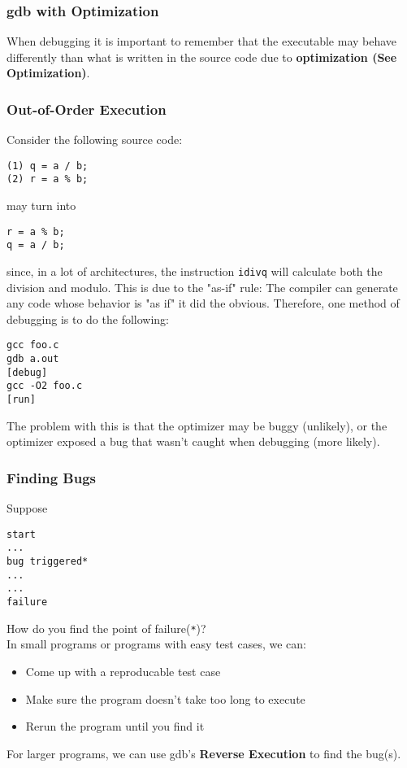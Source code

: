 \documentclass[13pt]{article}
\begin{document}
\subsubsection{gdb with Optimization}
When debugging it is important to remember that the executable may behave differently than what is written in the source code due to \textbf{optimization (See Optimization)}.

\subsubsection*{Out-of-Order Execution}
Consider the following source code:
\begin{verbatim}
(1) q = a / b;
(2) r = a % b;
\end{verbatim}
may turn into
\begin{verbatim}
r = a % b;
q = a / b;
\end{verbatim}
since, in a lot of architectures, the instruction \texttt{idivq} will calculate both the division and modulo. This is due to the "as-if" rule: The compiler can generate any code whose behavior is "as if" it did the obvious. Therefore, one method of debugging is to do the following:
\begin{verbatim}
gcc foo.c
gdb a.out
[debug]
gcc -O2 foo.c
[run]
\end{verbatim}
The problem with this is that the optimizer may be buggy (unlikely), or the optimizer exposed a bug that wasn't caught when debugging (more likely).

\subsubsection{Finding Bugs}
Suppose
\begin{verbatim}
start
...
bug triggered*
...
...
failure
\end{verbatim}
How do you find the point of failure(\texttt{*})? \\
In small programs or programs with easy test cases, we can:
\begin{itemize}[label=]
\item Come up with a reproducable test case
\item Make sure the program doesn't take too long to execute
\item Rerun the program until you find it
\end{itemize}
For larger programs, we can use gdb's \textbf{Reverse Execution} to find the bug(s).
\end{document}
